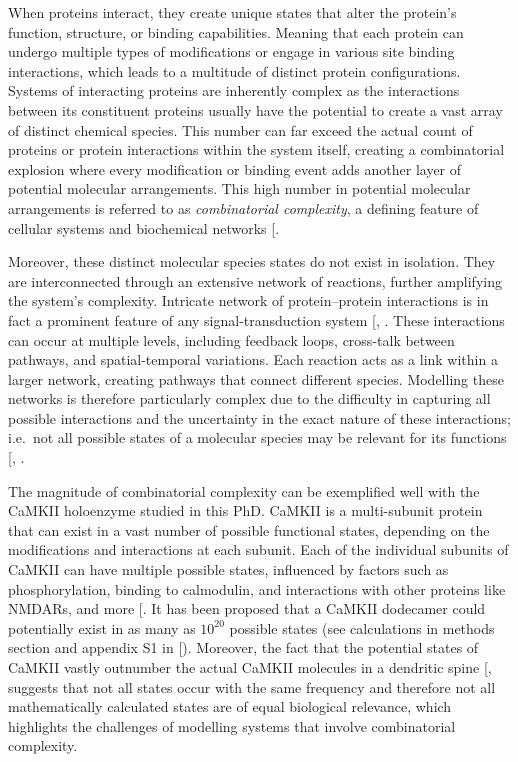 \documentclass[
  11pt,
  letterpaper,
]{scrreprt}
\begin{document}
When proteins interact, they create unique states that alter the
protein's function, structure, or binding capabilities. Meaning that
each protein can undergo multiple types of modifications or engage in
various site binding interactions, which leads to a multitude of
distinct protein configurations. Systems of interacting proteins are
inherently complex as the interactions between its constituent proteins
usually have the potential to create a vast array of distinct chemical
species. This number can far exceed the actual count of proteins or
protein interactions within the system itself, creating a combinatorial
explosion where every modification or binding event adds another layer
of potential molecular arrangements. This high number in potential
molecular arrangements is referred to as \emph{combinatorial
complexity}, a defining feature of cellular systems and biochemical
networks {[}\citeproc{ref-stefan2014Multistate}{283}{]}.

Moreover, these distinct molecular species states do not exist in
isolation. They are interconnected through an extensive network of
reactions, further amplifying the system's complexity. Intricate network
of protein--protein interactions is in fact a prominent feature of any
signal-transduction system {[},
\citeproc{ref-hunter2000Signaling}{285}{]}. These interactions can occur
at multiple levels, including feedback loops, cross-talk between
pathways, and spatial-temporal variations. Each reaction acts as a link
within a larger network, creating pathways that connect different
species. Modelling these networks is therefore particularly complex due
to the difficulty in capturing all possible interactions and the
uncertainty in the exact nature of these interactions; i.e.~not all
possible states of a molecular species may be relevant for its functions
{[},
\citeproc{ref-changeux2005Allosteric}{286}{]}.

The magnitude of combinatorial complexity can be exemplified well with
the CaMKII holoenzyme studied in this PhD. CaMKII is a multi-subunit
protein that can exist in a vast number of possible functional states,
depending on the modifications and interactions at each subunit. Each of
the individual subunits of CaMKII can have multiple possible states,
influenced by factors such as phosphorylation, binding to calmodulin,
and interactions with other proteins like NMDARs, and more
{[}\citeproc{ref-nicoll2023Synapticc}{154}{]}. It has been proposed that
a CaMKII dodecamer could potentially exist in as many as \(10^{20}\)
possible states (see calculations in methods section and appendix S1 in
{[}\citeproc{ref-pharris2019Multistate}{185}{]}). Moreover, the fact
that the potential states of CaMKII vastly outnumber the actual CaMKII
molecules in a dendritic spine
{[}\citeproc{ref-pharris2019Multistate}{185}{]}, suggests that not all
states occur with the same frequency and therefore not all
mathematically calculated states are of equal biological relevance,
which highlights the challenges of modelling systems that involve
combinatorial complexity.
\end{document}
